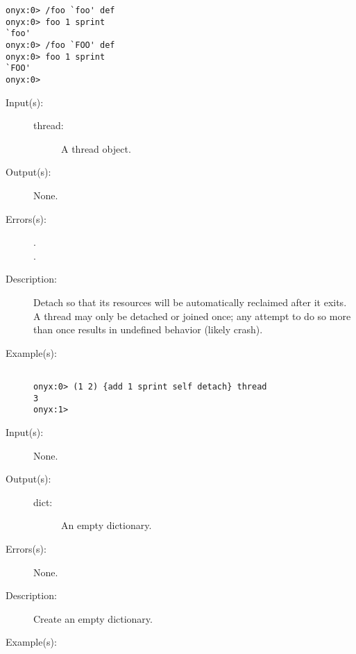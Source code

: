 \begin{description}
\begin{description}
\begin{verbatim}
onyx:0> /foo `foo' def
onyx:0> foo 1 sprint
`foo'
onyx:0> /foo `FOO' def
onyx:0> foo 1 sprint
`FOO'
onyx:0>
		\end{verbatim}
	\end{description}
\label{systemdict:detach}
\item[{\onyxop{thread}{detach}{--}}: ]
	\begin{description}\item[]
	\item[Input(s): ]
		\begin{description}\item[]
		\item[thread: ]
			A thread object.
		\end{description}
	\item[Output(s): ] None.
	\item[Errors(s): ]
		\begin{description}\item[]
		\item[.]
		\item[.]
		\end{description}
	\item[Description: ]
		Detach  so that its resources will be
		automatically reclaimed after it exits.  A thread may only be
		detached or joined once; any attempt to do so more than once
		results in undefined behavior (likely crash).
	\item[Example(s): ]\begin{verbatim}

onyx:0> (1 2) {add 1 sprint self detach} thread
3
onyx:1>
		\end{verbatim}
	\end{description}
\label{systemdict:dict}
\item[{\onyxop{--}{dict}{dict}}: ]
	\begin{description}\item[]
	\item[Input(s): ] None.
	\item[Output(s): ]
		\begin{description}\item[]
		\item[dict: ]
			An empty dictionary.
		\end{description}
	\item[Errors(s): ] None.
	\item[Description: ]
		Create an empty dictionary.
	\item[Example(s): ]\begin{verbatim}


\end{verbatim}
\end{description}
\end{description}
